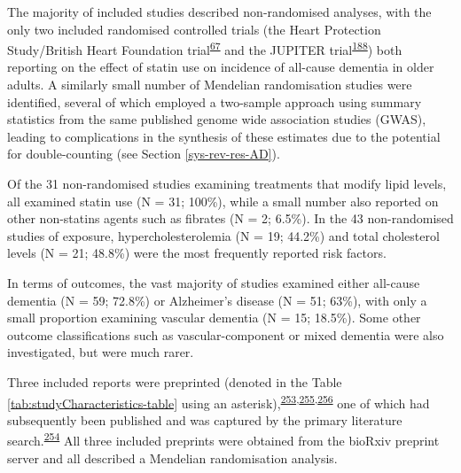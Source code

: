 \documentclass[a4paper, twoside]{templates/ociamthesis}
\begin{document}
The majority of included studies described non-randomised analyses, with the only two included randomised controlled trials (the Heart Protection Study/British Heart Foundation trial\textsuperscript{\protect\hyperlink{ref-heartprotectionstudycollaborativegroup2002}{67}} and the JUPITER trial\textsuperscript{\protect\hyperlink{ref-ridker2008}{188}}) both reporting on the effect of statin use on incidence of all-cause dementia in older adults. A similarly small number of Mendelian randomisation studies were identified, several of which employed a two-sample approach using summary statistics from the same published genome wide association studies (GWAS), leading to complications in the synthesis of these estimates due to the potential for double-counting (see Section \ref{sys-rev-res-AD}).

Of the 31 non-randomised studies examining treatments that modify lipid levels, all examined statin use (N = 31; 100\%), while a small number also reported on other non-statins agents such as fibrates (N = 2; 6.5\%). In the 43 non-randomised studies of exposure, hypercholesterolemia (N = 19; 44.2\%) and total cholesterol levels (N = 21; 48.8\%) were the most frequently reported risk factors.

In terms of outcomes, the vast majority of studies examined either all-cause dementia (N = 59; 72.8\%) or Alzheimer's disease (N = 51; 63\%), with only a small proportion examining vascular dementia (N = 15; 18.5\%). Some other outcome classifications such as vascular-component or mixed dementia were also investigated, but were much rarer.

Three included reports were preprinted (denoted in the Table \ref{tab:studyCharacteristics-table} using an asterisk),\textsuperscript{\protect\hyperlink{ref-so2017}{253},\protect\hyperlink{ref-andrews2019}{255},\protect\hyperlink{ref-zhu2017}{256}} one of which had subsequently been published and was captured by the primary literature search.\textsuperscript{\protect\hyperlink{ref-zhu2018}{254}} All three included preprints were obtained from the bioRxiv preprint server and all described a Mendelian randomisation analysis.
\end{document}
